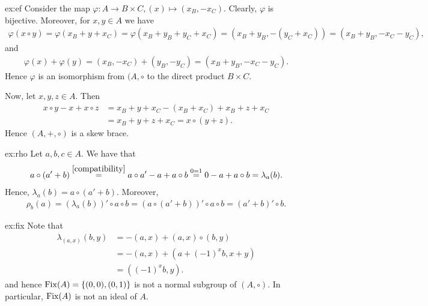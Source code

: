 \begin{sol}{ex:ef}
    Consider the map $\varphi:A\to B\times C, (x) \mapsto (x_B,-x_C)$. Clearly, $\varphi$ is bijective. Moreover, for $x,y\in A$ we have
    \begin{align*}
        \varphi(x\circ y) = \varphi(x_B+y+x_C) = \varphi(x_B+y_B+y_C+x_C) 
        =(x_B+y_B,-(y_C+x_C)) = (x_B+y_B,-x_C-y_C),
    \end{align*}
    and 
    \begin{align*}
        \varphi(x)+\varphi(y) = (x_B,-x_C) + (y_B,-y_C) = (x_B+y_B,-x_C-y_C).
    \end{align*}
    Hence $\varphi$ is an isomorphism from $(A,\circ$ to the direct product $B\times C$.
    
    Now, let $x,y,z \in A$. Then 
    \begin{align*}
        x\circ y - x + x\circ z &= x_B + y + x_C - (x_B+x_C) +x_B + z + x_C\\
        &=x_B + y + z + x_C = x \circ (y+z).
    \end{align*}
    Hence $(A,+,\circ)$ is a skew brace.
\end{sol}

\begin{sol}{ex:rho}
    Let $a,b,c\in A$. We have that
    \begin{align*}
        a\circ(a'+b) \overset{\eqref{compatibility}}{=} a \circ a' - a + a\circ b \overset{0=1}{=} 0 - a + a\circ b = \lambda_a(b).
    \end{align*}
    Hence, $\lambda_a(b)= a\circ(a'+b)$. Moreover,
    \begin{align*}
        \rho_b(a) = (\lambda_a(b))'\circ a \circ b =(a\circ(a'+b))' \circ a \circ b
        = (a'+b)'\circ b.
    \end{align*}
\end{sol}

\begin{sol}{ex:fix}
    Note that  
    \begin{align*}
        \lambda_{(a,x)}(b,y) &= - (a,x) + (a,x)\circ (b,y)\\ &= -(a,x)+(a+(-1)^xb, x+y) \\&=((-1)^xb,y).
    \end{align*}
    and hence $\operatorname{Fix}(A) = \{(0,0),(0,1)\}$ is not a normal subgroup of $(A,\circ)$. 
    In particular, $\operatorname{Fix}(A)$ is not an ideal of $A$.
\end{sol}

